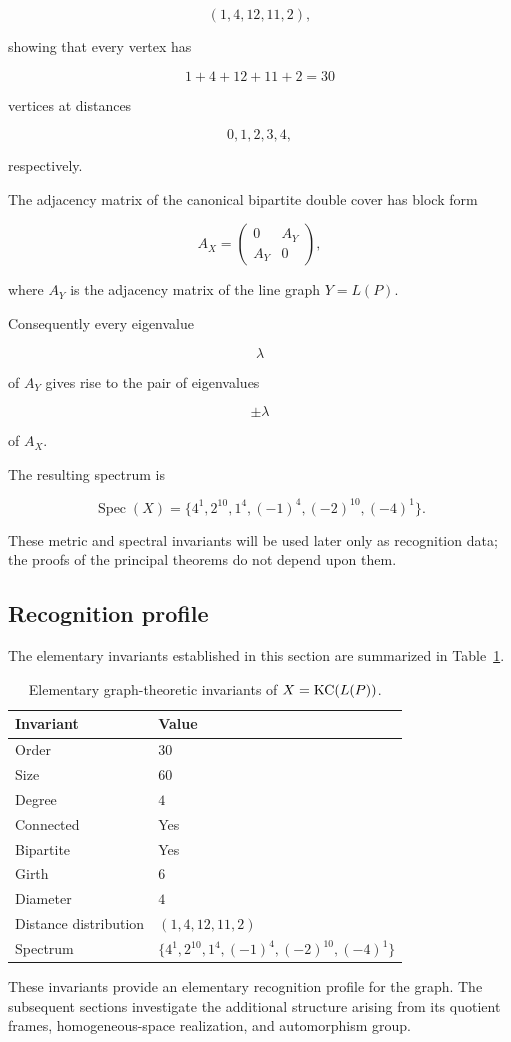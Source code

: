 \[
(1,4,12,11,2),
\]

showing that every vertex has

\[
1+4+12+11+2
=
30
\]

vertices at distances

\[
0,1,2,3,4,
\]

respectively.

The adjacency matrix of the canonical bipartite double cover has block
form

\[
A_X
=
\begin{pmatrix}
0&A_Y\\
A_Y&0
\end{pmatrix},
\]

where \(A_Y\) is the adjacency matrix of the line graph \(Y=L(P)\).

Consequently every eigenvalue

\[
\lambda
\]

of \(A_Y\) gives rise to the pair of eigenvalues

\[
\pm\lambda
\]

of \(A_X\).

The resulting spectrum is

\[
\operatorname{Spec}(X)
=
\{
4^{1},
2^{10},
1^{4},
(-1)^{4},
(-2)^{10},
(-4)^{1}
\}.
\]

These metric and spectral invariants will be used later only as recognition
data; the proofs of the principal theorems do not depend upon them.


\subsection{Recognition profile}

The elementary invariants established in this section are summarized in
Table~\ref{tab:recognition-profile}.

\begin{table}[h]
\centering
\begin{tabular}{ll}
\toprule
Invariant & Value\\
\midrule
Order & \(30\)\\
Size & \(60\)\\
Degree & \(4\)\\
Connected & Yes\\
Bipartite & Yes\\
Girth & \(6\)\\
Diameter & \(4\)\\
Distance distribution & \((1,4,12,11,2)\)\\
Spectrum &
\(\{4^{1},2^{10},1^{4},(-1)^{4},(-2)^{10},(-4)^{1}\}\)\\
\bottomrule
\end{tabular}
\caption{Elementary graph-theoretic invariants of
\(X=\operatorname{KC}(L(P))\).}
\label{tab:recognition-profile}
\end{table}

These invariants provide an elementary recognition profile for the graph.
The subsequent sections investigate the additional structure arising from
its quotient frames, homogeneous-space realization, and automorphism
group.
